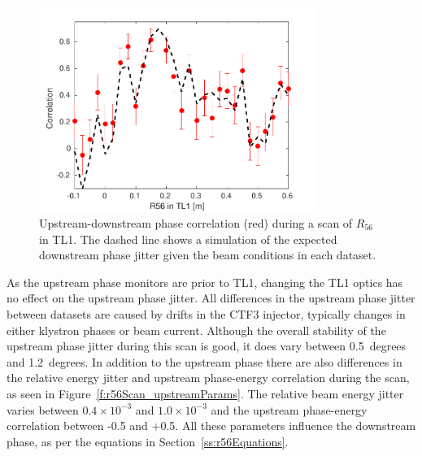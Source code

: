 \begin{figure}
  \centering
  \includegraphics[width=0.8\textwidth]{Figures/propagation/r56Scan_correlation}
  \caption{Upstream-downstream phase correlation (red) during a scan of \(R_{56}\) in TL1. The dashed line shows a simulation of the expected downstream phase jitter given the beam conditions in each dataset.}
  \label{f:r56Scan_correlation}
\end{figure}

As the upstream phase monitors are prior to TL1, changing the TL1 optics has no effect on the upstream phase jitter. All differences in the upstream phase jitter between datasets are caused by drifts in the CTF3 injector, typically changes in either klystron phases or beam current. Although the overall stability of the upstream phase jitter during this scan is good, it does vary between 0.5~degrees and 1.2~degrees. In addition to the upstream phase there are also differences in the relative energy jitter and upstream phase-energy correlation during the scan, as seen in Figure~\ref{f:r56Scan_upstreamParams}. The relative beam energy jitter varies between \(0.4\times10^{-3}\) and \(1.0\times10^{-3}\) and the upstream phase-energy correlation between -0.5 and +0.5. All these parameters influence the downstream phase, as per the equations in Section~\ref{ss:r56Equations}.

